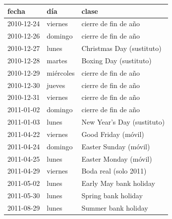 \begin{tabular}{lll}
\toprule
fecha & día & clase \\
\midrule
2010-12-24 & viernes & cierre de fin de año \\
2010-12-26 & domingo & cierre de fin de año \\
2010-12-27 & lunes & Christmas Day (sustituto) \\
2010-12-28 & martes & Boxing Day (sustituto) \\
2010-12-29 & miércoles & cierre de fin de año \\
2010-12-30 & jueves & cierre de fin de año \\
2010-12-31 & viernes & cierre de fin de año \\
2011-01-02 & domingo & cierre de fin de año \\
2011-01-03 & lunes & New Year's Day (sustituto) \\
2011-04-22 & viernes & Good Friday (móvil) \\
2011-04-24 & domingo & Easter Sunday (móvil) \\
2011-04-25 & lunes & Easter Monday (móvil) \\
2011-04-29 & viernes & Boda real (solo 2011) \\
2011-05-02 & lunes & Early May bank holiday \\
2011-05-30 & lunes & Spring bank holiday \\
2011-08-29 & lunes & Summer bank holiday \\
\bottomrule
\end{tabular}
